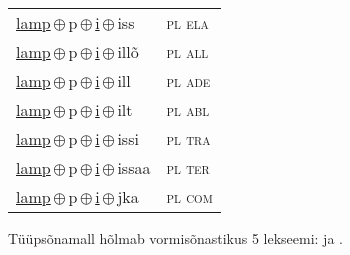\begin{minipage}{\textwidth}
\begin{sideways}
\begin{tabular}{l l}
\underline{lamp}\,$\oplus$\,p\,$\oplus$\,\underline{i}\,$\oplus$\,iss & \textsc{ pl ela } \\
\underline{lamp}\,$\oplus$\,p\,$\oplus$\,\underline{i}\,$\oplus$\,illõ & \textsc{ pl all } \\
\underline{lamp}\,$\oplus$\,p\,$\oplus$\,\underline{i}\,$\oplus$\,ill & \textsc{ pl ade } \\
\underline{lamp}\,$\oplus$\,p\,$\oplus$\,\underline{i}\,$\oplus$\,ilt & \textsc{ pl abl } \\
\underline{lamp}\,$\oplus$\,p\,$\oplus$\,\underline{i}\,$\oplus$\,issi & \textsc{ pl tra } \\
\underline{lamp}\,$\oplus$\,p\,$\oplus$\,\underline{i}\,$\oplus$\,issaa & \textsc{ pl ter } \\
\underline{lamp}\,$\oplus$\,p\,$\oplus$\,\underline{i}\,$\oplus$\,jka & \textsc{ pl com } \\
\end{tabular}
\end{sideways}
\label{tab:tüüpsõnamall-lamppi}

\end{minipage}

 
\vspace{1em}
\noindent Tüüpsõnamall  hõlmab vormisõnastikus 5 lekseemi:  ja .
